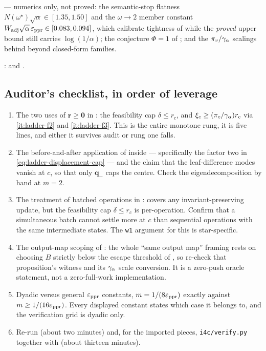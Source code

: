 \statusmeasured{} --- numerics only, not proved: the semantic-stop flatness
$N(\omega^{\star})\sqrt\alpha\in[1.35,1.50]$ and the $\omega\to2$ member
constant $W_{\mathrm{adj}}\sqrt\alpha\,\varepsilon_{\mathrm{ppr}}\in[0.083,0.094]$, which calibrate
tightness of  while the \emph{proved}
upper bound still carries $\log(1/\alpha)$; the conjecture $\Phi=1$ of
; and the $\pi_{v}/\gamma_{\alpha}$ scalings behind
 beyond closed-form families.

\statusopen{}:  and .

\subsection*{Auditor's checklist, in order of leverage}

\begin{enumerate}[leftmargin=2.2em]
    \item The two uses of $\bm{r}\ge\bm{0}$ in
        : the
        feasibility cap $\delta\le r_{c}$, and
        $\xi_{c}\ge(\pi_{c}/\gamma_{\alpha})r_{c}$
        via \ref{it:ladder-f2} and \ref{it:ladder-f3}. This is the entire
        monotone rung, it is five lines, and either it survives audit or rung
        one falls.
    \item The before-and-after application of 
        inside  --- specifically the factor two
        in \eqref{eq:ladder-displacement-cap} --- and the claim that the
        leaf-difference modes vanish at $c$, so that only $\bm{q}_{-}$ caps the
        centre. Check the eigendecomposition by hand at $m=2$.
    \item The treatment of batched operations in
        :
         covers any invariant-preserving update, but
        the feasibility cap $\delta\le r_{c}$ is per-operation. Confirm that a
        simultaneous batch cannot settle more at $c$ than sequential
        operations with the same intermediate states. The \texttt{w1}
        argument for this is star-specific.
    \item The output-map scoping of : the whole
        ``same output map'' framing rests on choosing $B$ strictly below the
        escape threshold of , so re-check that
        proposition's witness and its $\gamma_{\alpha}$ scale conversion. It is a
        zero-push oracle statement, not a zero-full-work implementation.
    \item Dyadic versus general $\varepsilon_{\mathrm{ppr}}$ constants, $m=1/(8\varepsilon_{\mathrm{ppr}})$ exactly
        against $m\ge1/(16\varepsilon_{\mathrm{ppr}})$. Every displayed constant states which
        case it belongs to, and the verification grid is dyadic only.
    \item Re-run  (about two minutes) and, for the
        imported pieces, \texttt{i4c/verify.py} together with
         (about thirteen minutes).
\end{enumerate}

